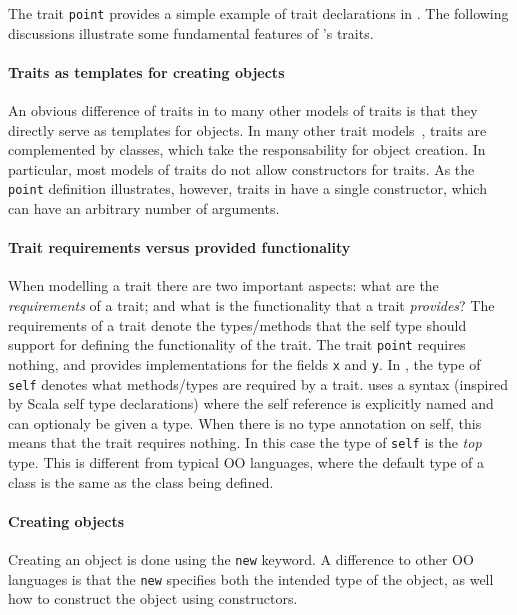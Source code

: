 The trait \lstinline{point} provides a simple example of trait
declarations in \name. The following discussions illustrate 
some fundamental features of \name's traits.

\paragraph{Traits as templates for creating objects} An obvious difference of
traits in \name to many other models of traits is that they directly serve as
templates for objects. In many other trait
models~\cite{scharli2003traits,fisher2004typed,odersky2005scalable}, traits are
complemented by classes, which take the responsability for object creation. In
particular, most models of traits do not allow constructors for traits. As the
\lstinline{point} definition illustrates, however, traits in \name have a single
constructor, which can have an arbitrary number of arguments.

\paragraph{Trait requirements versus provided functionality}
When modelling a trait there are two important 
aspects: what are the \emph{requirements} of a trait; and what is 
the functionality that a trait \emph{provides}? The requirements of a
trait denote the types/methods that the self type should support for
defining the functionality of the trait.
The trait \lstinline{point}
requires nothing, and provides implementations for the fields 
\lstinline{x} and \lstinline{y}.  In \name, the type
of \lstinline$self$ denotes what methods/types are required 
by a trait. \name uses a syntax (inspired by Scala 
self type declarations) where the self reference is explicitly named 
and can optionaly be given a type. When there is no type annotation 
on self, this means that the trait requires nothing. In this case 
the type of \lstinline{self} is the \emph{top} type. 
This is different from typical OO languages, where the default type 
of a class is the same as the class being defined.


\paragraph{Creating objects}
Creating an object is done using the \lstinline{new} keyword. A
difference to other OO languages is that the \lstinline{new} specifies
both the intended type of the object, as well how to construct the
object using constructors.


